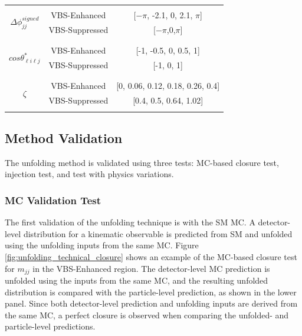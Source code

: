 \begin{table}[!htbp]
\begin{center}
\begin{tabular}{ | c | c | c | }
    & &\\
    \hline
    \multirow{4}{*}{ $\Delta \phi_{jj}^{signed}$ } &  &  \\
    & VBS-Enhanced & [$-\pi$, -2.1, 0, 2.1, $\pi$] \\
    & VBS-Suppressed & [$-\pi$,0,$\pi$] \\
    & & \\
    \hline
    \multirow{4}{*}{ $cos \theta_{\ell i\ell j}^{\ast}$ } &  &  \\
    & VBS-Enhanced & [-1, -0.5, 0, 0.5, 1] \\
    & VBS-Suppressed & [-1, 0, 1]\\
    & & \\
    \hline
    \multirow{4}{*}{ $\zeta$ } &  &  \\
    & VBS-Enhanced &[0, 0.06, 0.12, 0.18, 0.26, 0.4] \\
    & VBS-Suppressed & [0.4, 0.5, 0.64, 1.02]\\
    & &\\
    \hline
    \end{tabular}
    \end{center}
\end{table}

\newpage

\subsection{Method Validation}
\label{subsec:UnfoldingValidation}
The unfolding method is validated using three tests: MC-based closure test, injection test, and test with physics variations.  

\subsubsection{MC Validation Test}
\label{subsubsec:MCClosure}

The first validation of the unfolding technique is with the SM MC. A detector-level distribution for a kinematic observable is predicted from SM and unfolded using the unfolding inputs from the same MC. Figure \ref{fig:unfolding_technical_closure} shows an example of the MC-based closure test for $m_{jj}$ in the VBS-Enhanced region. The detector-level MC prediction is unfolded using the inputs from the same MC, and the resulting unfolded distribution is compared with the particle-level prediction, as shown in the lower panel. Since both detector-level prediction and unfolding inputs are derived from the same MC, a perfect closure is observed when comparing the unfolded- and particle-level predictions.

